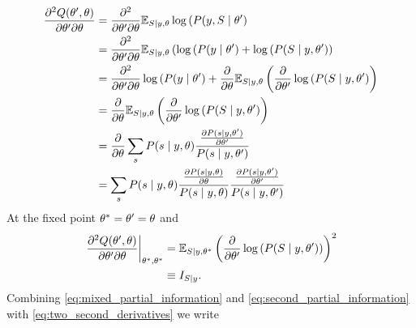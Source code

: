 \begin{align}
  \nonumber
  \frac{\partial^2 Q(\NewParameters,  \OldParameters)}{\partial \NewParameters \partial
  \OldParameters}
  &= \frac{\partial^2}{\partial \NewParameters \partial \OldParameters} \EV_{S \given y, \OldParameters}
    \log \left( P(y, S \given \NewParameters \right) \\
  \nonumber
  &= \frac{\partial^2}{\partial \NewParameters \partial \OldParameters} \EV_{S \given y, \OldParameters}
    \left( \log \left( P(y \given \NewParameters \right) + \log \left( P(S
    \given y, \NewParameters \right) \right)\\
  \nonumber
  &= \frac{\partial^2}{\partial \NewParameters \partial \OldParameters} \log \left( P(y \given
    \NewParameters \right) + \frac{\partial}{\partial \OldParameters} \EV_{S \given y, \OldParameters} \left(
    \frac{\partial}{\partial \NewParameters} \log \left( P(S \given y,
    \NewParameters \right) \right) \\
  \nonumber
  &=  \frac{\partial}{\partial \OldParameters} \EV_{S \given y, \OldParameters} \left(
    \frac{\partial}{\partial \NewParameters} \log \left( P(S \given y,
    \NewParameters \right) \right) \\
  \nonumber
  &= \frac{\partial}{\partial \OldParameters} \sum_s P(s \given y, \OldParameters) %
    \frac{ %
    \frac{\partial P(s \given y,\NewParameters )}{\partial \NewParameters}
    }{P(s \given y,\NewParameters )}  \\
  \nonumber
  &= \sum_s P(s \given y, \OldParameters) %
    \frac{ %
    \frac{\partial P(s \given y,\OldParameters )}{\partial \OldParameters}
    }{P(s \given y,\OldParameters )}
    \frac{ %
    \frac{\partial P(s \given y,\NewParameters )}{\partial \NewParameters}
    }{P(s \given y,\NewParameters )}
\end{align}
At the fixed point ${\theta^*} = \theta' = \theta$
and
\begin{align}
  \label{eq:score_fisher}
  \left. \frac{\partial^2 Q(\theta',  \theta)}{\partial \theta'
  \partial \theta} \right|_{{\theta^*}, {\theta^*}}
  &= \mathbb{E}_{S \mid y, {\theta^*}} \left( \frac{\partial}{\partial
    \theta'} \log \left( P(S \mid y, \theta' )\right) \right)^2\\
  \label{eq:mixed_partial_information}
  &\equiv I_{S \mid y}.
\end{align}
Combining \eqref{eq:mixed_partial_information} and
\eqref{eq:second_partial_information} with
\eqref{eq:two_second_derivatives} we write
